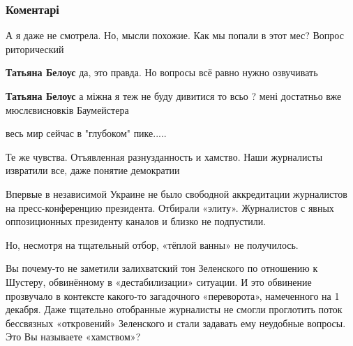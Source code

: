  
 
 
 
 
\subsubsection{Коментарі}
\label{sec:26_11_2021.fb.baumejster_andrej.kiev.filosof.1.schastje_zhurnalist_politolog.cmt}

\begin{itemize} %
А я даже не смотрела. Но, мысли похожие. Как мы попали в этот мес? Вопрос риторический

\begin{itemize} %
\textbf{Татьяна Белоус} да, это правда. Но вопросы всё равно нужно озвучивать

\textbf{Татьяна Белоус} а міжна я теж не буду дивитися то всьо ? мені достатньо вже мюслєвисновків Баумейстера
\end{itemize} %

весь мир сейчас в "глубоком" пике.....


Те же чувства. Отъявленная разнузданность и хамство. Наши журналисты извратили все, даже понятие демократии


Впервые в независимой Украине не было свободной аккредитации журналистов на
пресс-конференцию президента. Отбирали «элиту». Журналистов с явных
оппозиционных президенту каналов и близко не подпустили.

Но, несмотря на тщательный отбор, «тёплой ванны» не получилось.

Вы почему-то не заметили залихватский тон Зеленского по отношению к Шустеру,
обвинённому в «дестабилизации» ситуации. И это обвинение прозвучало в контексте
какого-то загадочного «переворота», намеченного на 1 декабря. Даже тщательно
отобранные журналисты не смогли проглотить поток бессвязных «откровений»
Зеленского и стали задавать ему неудобные вопросы. Это Вы называете «хамством»?


\end{itemize}
